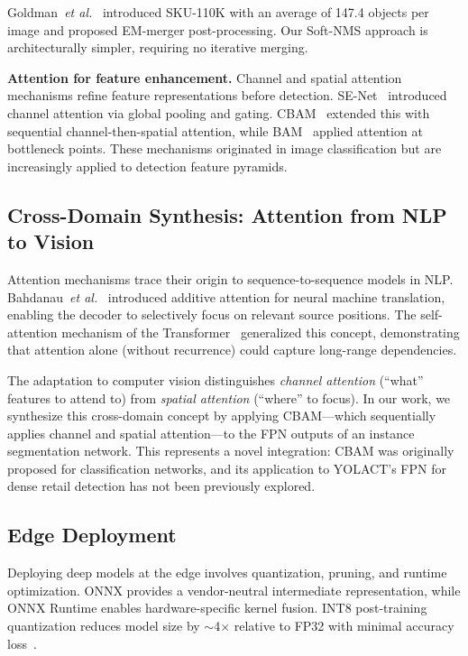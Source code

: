 \documentclass[conference]{IEEEtran}
\newcommand{\etal}{\emph{et al.}}
\begin{document}
Goldman~\etal~\cite{goldman2019dense} introduced SKU-110K with an
average of 147.4 objects per image and proposed EM-merger
post-processing. Our Soft-NMS approach is architecturally simpler,
requiring no iterative merging.

\textbf{Attention for feature enhancement.} Channel and spatial attention
mechanisms refine feature representations before detection.
SE-Net~\cite{hu2018squeeze} introduced channel attention via global
pooling and gating. CBAM~\cite{woo2018cbam} extended this with
sequential channel-then-spatial attention, while
BAM~\cite{park2018bam} applied attention at bottleneck points.
These mechanisms originated in image classification but are increasingly
applied to detection feature pyramids.

\subsection{Cross-Domain Synthesis: Attention from NLP to Vision}

Attention mechanisms trace their origin to sequence-to-sequence models
in NLP. Bahdanau~\etal~\cite{bahdanau2015attention} introduced additive
attention for neural machine translation, enabling the decoder to
selectively focus on relevant source positions. The self-attention
mechanism of the Transformer~\cite{vaswani2017attention} generalized
this concept, demonstrating that attention alone (without recurrence)
could capture long-range dependencies.

The adaptation to computer vision distinguishes \emph{channel attention}
(``what'' features to attend to) from \emph{spatial attention}
(``where'' to focus). In our work, we synthesize this cross-domain
concept by applying CBAM---which sequentially applies channel and
spatial attention---to the FPN outputs of an instance segmentation
network. This represents a novel integration: CBAM was originally
proposed for classification networks, and its application to YOLACT's
FPN for dense retail detection has not been previously explored.

\subsection{Edge Deployment}

Deploying deep models at the edge involves quantization, pruning, and
runtime optimization. ONNX provides a vendor-neutral intermediate
representation, while ONNX Runtime enables hardware-specific
kernel fusion. INT8 post-training quantization reduces model
size by $\sim$4$\times$ relative to FP32 with minimal accuracy
loss~\cite{chen2019mmdetection}.
\end{document}
